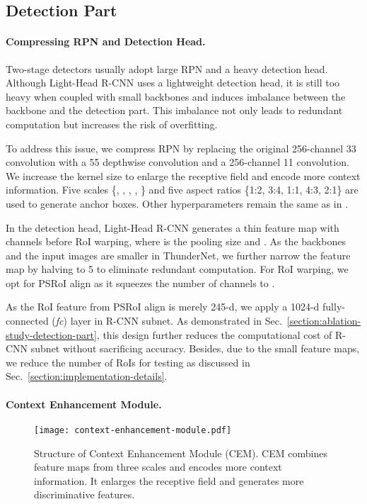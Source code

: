 \documentclass[10pt,twocolumn,letterpaper]{article}
\begin{document}
\subsection{Detection Part}

\paragraph{Compressing RPN and Detection Head.}


Two-stage detectors usually adopt large RPN and a heavy detection head.
Although Light-Head R-CNN \cite{li2017light} uses a lightweight detection head, it is still too heavy when coupled with small backbones and induces imbalance between the backbone and the detection part.
This imbalance not only leads to redundant computation but increases the risk of overfitting.

To address this issue, we compress RPN by replacing the original 256-channel 33 convolution with a 55 depthwise convolution and a 256-channel 11 convolution.
We increase the kernel size to enlarge the receptive field and encode more context information.
Five scales \{, , , , \} and five aspect ratios \{1:2, 3:4, 1:1, 4:3, 2:1\} are used to generate anchor boxes.
Other hyperparameters remain the same as in \cite{li2017light}.

In the detection head, Light-Head R-CNN generates a thin feature map with  channels before RoI warping, where  is the pooling size and .
As the backbones and the input images are smaller in ThunderNet, we further narrow the feature map by halving  to 5 to eliminate redundant computation.
For RoI warping, we opt for PSRoI align as it squeezes the number of channels to .

As the RoI feature from PSRoI align is merely 245-d, we apply a 1024-d fully-connected (\emph{fc}) layer in R-CNN subnet.
As demonstrated in Sec.~\ref{section:ablation-study-detection-part}, this design further reduces the computational cost of R-CNN subnet without sacrificing accuracy.
Besides, due to the small feature maps, we reduce the number of RoIs for testing as discussed in Sec.~\ref{section:implementation-details}.



\vspace{-12pt}
\paragraph{Context Enhancement Module.}


\begin{figure}[t]
\centering
\texttt{[image: context-enhancement-module.pdf]}
\caption{
Structure of Context Enhancement Module (CEM).
CEM combines feature maps from three scales and encodes more context information.
It enlarges the receptive field and generates more discriminative features.
}
\label{figure:context-enhancemene-module}
\end{figure}
\end{document}
